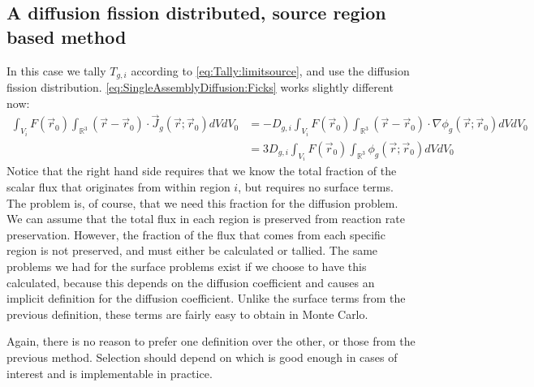 \documentclass[a4paper,letterpaper,12pt,oneside,draft]{article}
\newcommand{\allspace}{\ensuremath{\mathbb{R}^3}}
\newcommand{\vr}{\ensuremath{\vec{r}}}
\newcommand{\dvr}{\left(\vr-\vr_0\right)}
\begin{document}
\subsection{A diffusion fission distributed, source region based method}
In this case we tally $T_{g,i}$ according to \cref{eq:Tally:limitsource}, and use the diffusion fission distribution. \cref{eq:SingleAssemblyDiffusion:Ficks} works slightly different now:
\begin{align}
    \nonumber
    \int_{V_i} F(\vr_0)\int_{\allspace} \dvr\cdot\vec{J}_g(\vr;\vr_0) dVdV_0 &= -D_{g,i} \int_{V_i} F(\vr_0) \int_{\allspace} \dvr\cdot\nabla \phi_g(\vr;\vr_0)dVdV_0 \\
    \label{eq:DiffFissSource}
    &= 3D_{g,i} \int_{V_i}F(\vr_0)\int_{\allspace}\phi_g(\vr;\vr_0)dVdV_0 
\end{align}
Notice that the right hand side requires that we know the total fraction of the scalar flux that originates from within region $i$, but requires no surface terms.
The problem is, of course, that we need this fraction for the diffusion problem. 
We can assume that the total flux in each region is preserved from reaction rate preservation. 
However, the fraction of the flux that comes from each specific region is not preserved, and must either be calculated or tallied.
The same problems we had for the surface problems exist if we choose to have this calculated, because this depends on the diffusion coefficient and causes an implicit definition for the diffusion coefficient.
Unlike the surface terms from the previous definition, these terms are fairly easy to obtain in Monte Carlo.

Again, there is no reason to prefer one definition over the other, or those from the previous method.
Selection should depend on which is good enough in cases of interest and is implementable in practice.
\end{document}
